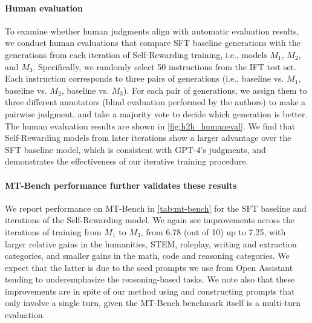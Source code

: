 \documentclass{article}
\begin{document}
\paragraph{Human evaluation}  
To examine whether human judgments align with automatic evaluation results, we conduct human evaluations that compare SFT baseline generations with the generations from each iteration of Self-Rewarding training, i.e., models $M_1$, $M_2$, and $M_3$. Specifically, we randomly select 50 instructions from the IFT test set. Each instruction corresponds to three pairs of generations (i.e., baseline vs. $M_1$, baseline vs. $M_2$, baseline vs. $M_3$). For each pair of generations, we assign them to three different annotators (blind evaluation performed by the authors) to make a pairwise judgment, and take a majority vote to decide which generation is better. The human evaluation results are shown in \autoref{fig:h2h_humaneval}. We find that Self-Rewarding models from later iterations show a larger advantage over the SFT baseline model, which is consistent with GPT-4's judgments, and demonstrates the effectiveness of our iterative training procedure.

\paragraph{MT-Bench performance further validates these results}  
We report performance on MT-Bench in \autoref{tab:mt-bench} for the SFT baseline and iterations of the Self-Rewarding model.  We again see improvements across the iterations of training from $M_1$ to $M_3$, from 6.78 (out of 10) up to 7.25, with larger relative gains in the humanities, STEM, roleplay, writing and extraction categories, and smaller gains in the math, code and reasoning categories.
We expect that the latter is due to the seed prompts we use from Open Assistant tending to underemphasize the reasoning-based tasks.
We note also that these improvements are in spite of our method using and constructing prompts that only involve a single turn, given the MT-Bench benchmark itself is a multi-turn evaluation.
\end{document}
